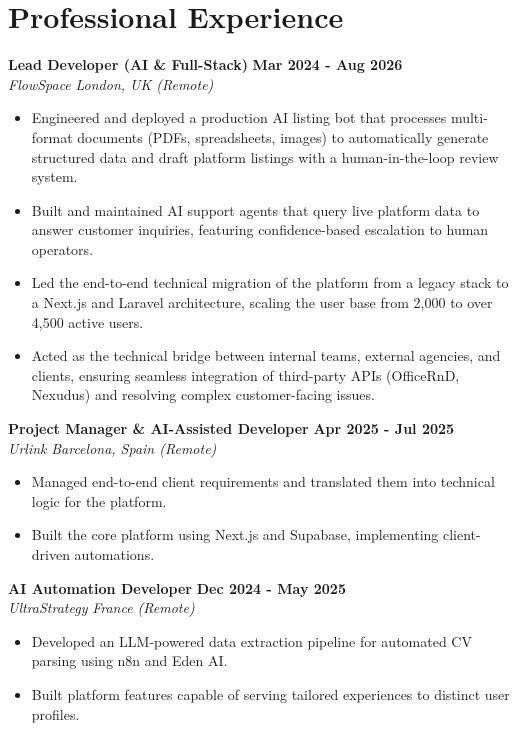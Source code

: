 \documentclass[10pt, a4paper]{article}
\begin{document}
\section{Professional Experience}

\textbf{Lead Developer (AI \& Full-Stack)} \hfill \textbf{Mar 2024 - Aug 2026} \\
\textit{FlowSpace} \hfill \textit{London, UK (Remote)}
\begin{itemize}[leftmargin=*, noitemsep]
    \item Engineered and deployed a production AI listing bot that processes multi-format documents (PDFs, spreadsheets, images) to automatically generate structured data and draft platform listings with a human-in-the-loop review system.
    \item Built and maintained AI support agents that query live platform data to answer customer inquiries, featuring confidence-based escalation to human operators.
    \item Led the end-to-end technical migration of the platform from a legacy stack to a Next.js and Laravel architecture, scaling the user base from 2,000 to over 4,500 active users.
    \item Acted as the technical bridge between internal teams, external agencies, and clients, ensuring seamless integration of third-party APIs (OfficeRnD, Nexudus) and resolving complex customer-facing issues.
\end{itemize}

\textbf{Project Manager \& AI-Assisted Developer} \hfill \textbf{Apr 2025 - Jul 2025} \\
\textit{Urlink} \hfill \textit{Barcelona, Spain (Remote)}
\begin{itemize}[leftmargin=*, noitemsep]
    \item Managed end-to-end client requirements and translated them into technical logic for the platform.
    \item Built the core platform using Next.js and Supabase, implementing client-driven automations.
\end{itemize}

\textbf{AI Automation Developer} \hfill \textbf{Dec 2024 - May 2025} \\
\textit{UltraStrategy} \hfill \textit{France (Remote)}
\begin{itemize}[leftmargin=*, noitemsep]
    \item Developed an LLM-powered data extraction pipeline for automated CV parsing using n8n and Eden AI.
    \item Built platform features capable of serving tailored experiences to distinct user profiles.
\end{itemize}
\end{document}
